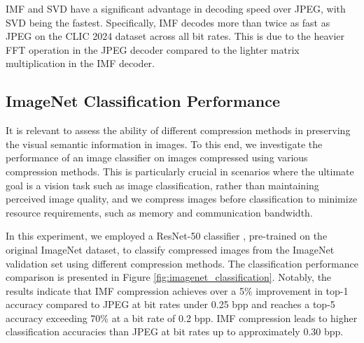 IMF and SVD have a significant advantage in decoding speed over JPEG, with SVD being the fastest. Specifically, IMF decodes more than twice as fast as JPEG on the CLIC 2024 dataset across all bit rates. This is due to the heavier FFT operation in the JPEG decoder compared to the lighter matrix multiplication in the IMF decoder. 


\subsection{ImageNet Classification Performance} \label{sec:imagenet_classification_performance}

It is relevant to assess the ability of different compression methods in preserving the visual semantic information in images. To this end, we investigate the performance of an image classifier on images compressed using various compression methods. This is particularly crucial in scenarios where the ultimate goal is a vision task such as image classification, rather than maintaining perceived image quality, and we compress images before classification to minimize resource requirements, such as memory and communication bandwidth.

In this experiment, we employed a ResNet-50 classifier \cite{he2016deep}, pre-trained on the original ImageNet \cite{deng2009imagenet} dataset, to classify compressed images from the ImageNet validation set using different compression methods. The classification performance comparison is presented in Figure \ref{fig:imagenet_classification}. Notably, the results indicate that IMF compression achieves over a 5\% improvement in top-1 accuracy compared to JPEG at bit rates under 0.25 bpp and reaches a top-5 accuracy exceeding 70\% at a bit rate of 0.2 bpp. IMF compression leads to higher classification accuracies than JPEG at bit rates up to approximately 0.30 bpp. 

